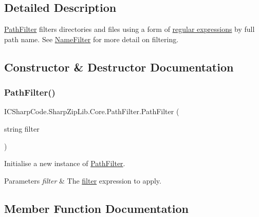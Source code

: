 \subsection{Detailed Description}
\hyperlink{class_i_c_sharp_code_1_1_sharp_zip_lib_1_1_core_1_1_path_filter}{Path\+Filter} filters directories and files using a form of \hyperlink{}{regular expressions} by full path name. See \hyperlink{class_i_c_sharp_code_1_1_sharp_zip_lib_1_1_core_1_1_name_filter}{Name\+Filter} for more detail on filtering. 



\subsection{Constructor \& Destructor Documentation}
\mbox{\label{class_i_c_sharp_code_1_1_sharp_zip_lib_1_1_core_1_1_path_filter_a361b2f89d26eb94675e7b9d50d31d418}} 
\subsubsection{\texorpdfstring{Path\+Filter()}{PathFilter()}}
{\footnotesize\ttfamily I\+C\+Sharp\+Code.\+Sharp\+Zip\+Lib.\+Core.\+Path\+Filter.\+Path\+Filter (\begin{DoxyParamCaption}\item[{string}]{filter }\end{DoxyParamCaption})\hspace{0.3cm}{\ttfamily [inline]}}



Initialise a new instance of \hyperlink{class_i_c_sharp_code_1_1_sharp_zip_lib_1_1_core_1_1_path_filter}{Path\+Filter}. 


\begin{DoxyParams}{Parameters}
{\em filter} & The \hyperlink{class_i_c_sharp_code_1_1_sharp_zip_lib_1_1_core_1_1_name_filter}{filter} expression to apply.\\
\hline
\end{DoxyParams}


\subsection{Member Function Documentation}
\mbox{\label{class_i_c_sharp_code_1_1_sharp_zip_lib_1_1_core_1_1_path_filter_a9c140b289a97036cdfe4eb55e1b5d5b8}} 
